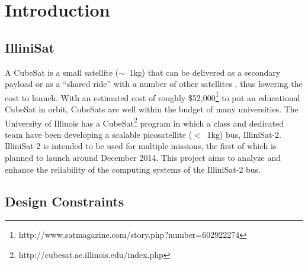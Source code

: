 \section{Introduction}
\subsection{IlliniSat}
A CubeSat is a small satellite ($\sim$~1kg) that can be delivered as a secondary
payload or as a ``shared ride'' with a number of other satellites , thus
lowering the cost to launch\cite{toorian2008cubesat}.  With an estimated cost of
roughly \$52,000\footnote{http://www.satmagazine.com/story.php?number=602922274}
to put an educational CubeSat in orbit, CubeSats are well within the budget of
many universities.  The University of Illinois has a
CubeSat\footnote{http://cubesat.ae.illinois.edu/index.php} program in which a
class and dedicated team have been developing a scalable picosatellite ($<$~1kg)
bus, IlliniSat-2.  IlliniSat-2 is intended to be used for multiple missions, the
first of which is planned to launch around December 2014.  This project aims to
analyze and enhance the reliability of the computing systems of the IlliniSat-2
bus.

\subsection{Design Constraints}
